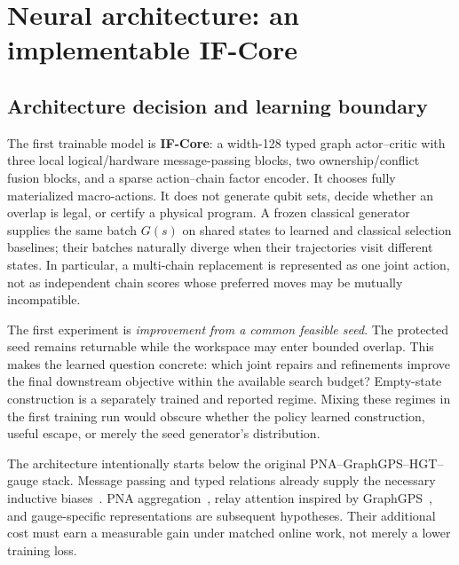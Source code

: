 \section{Neural architecture: an implementable IF-Core}
\label{sec:model}

\subsection{Architecture decision and learning boundary}

The first trainable model is \textbf{IF-Core}: a width-128 typed graph actor--critic with three local logical/hardware message-passing blocks, two ownership/conflict fusion blocks, and a sparse action--chain factor encoder. It chooses fully materialized macro-actions. It does not generate qubit sets, decide whether an overlap is legal, or certify a physical program. A frozen classical generator supplies the same batch $G(s)$ on shared states to learned and classical selection baselines; their batches naturally diverge when their trajectories visit different states. In particular, a multi-chain replacement is represented as one joint action, not as independent chain scores whose preferred moves may be mutually incompatible.

The first experiment is \emph{improvement from a common feasible seed}. The protected seed remains returnable while the workspace may enter bounded overlap. This makes the learned question concrete: which joint repairs and refinements improve the final downstream objective within the available search budget? Empty-state construction is a separately trained and reported regime. Mixing these regimes in the first training run would obscure whether the policy learned construction, useful escape, or merely the seed generator's distribution.

The architecture intentionally starts below the original PNA--GraphGPS--HGT--gauge stack. Message passing and typed relations already supply the necessary inductive biases~\cite{mpnn2017,hgt2020}. PNA aggregation~\cite{pna2020}, relay attention inspired by GraphGPS~\cite{gps2022}, and gauge-specific representations are subsequent hypotheses. Their additional cost must earn a measurable gain under matched online work, not merely a lower training loss.


